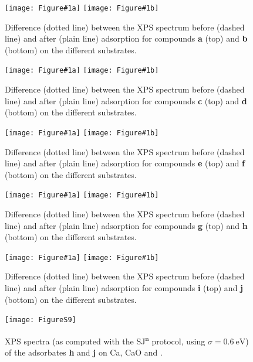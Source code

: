 \documentclass[journal=jpccck,manuscript=article]{achemso}
\begin{document}
\newcommand{\XPSsa}[3]{
	\begin{figure}[!h]
		\centering
		\texttt{[image: Figure\#1a]}
		\texttt{[image: Figure\#1b]}
		\caption{Difference (dotted line) between the XPS spectrum before (dashed line) and after (plain line) adsorption for compounds \textbf{#2} (top) and \textbf{#3} (bottom) on the different substrates.}
		\label{fig:spectraXPSads#2#3}
	\end{figure}
}

\XPSsa{S4}{a}{b}
\XPSsa{S5}{c}{d}
\XPSsa{S6}{e}{f}
\XPSsa{S7}{g}{h}
\XPSsa{S8}{i}{j}

\begin{figure}[!h]
	\centering
	\texttt{[image: FigureS9]}
	\caption{XPS spectra (as computed with the SJ\textsuperscript{n} protocol, using $\sigma=\SI{0.6}{\electronvolt}$) of the adsorbates \textbf{h} and \textbf{j} on Ca, CaO and .}
	\label{fig:possSJn}
\end{figure}
	
\end{document}
